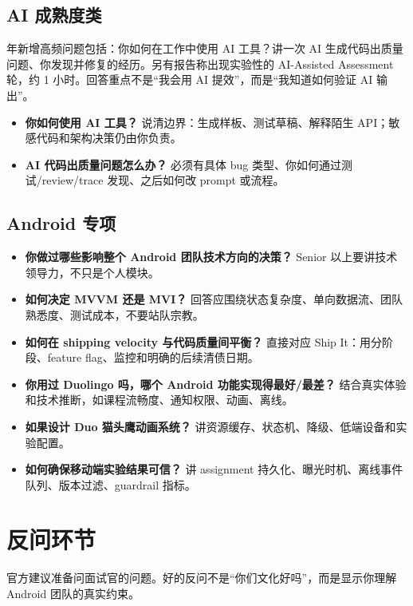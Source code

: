 \subsection{AI 成熟度类}

 年新增高频问题包括：你如何在工作中使用 AI 工具？讲一次 AI 生成代码出质量问题、你发现并修复的经历。另有报告称出现实验性的 AI-Assisted Assessment 轮，约 1 小时。回答重点不是“我会用 AI 提效”，而是“我知道如何验证 AI 输出”。

\begin{itemize}
  \item \textbf{你如何使用 AI 工具？} 说清边界：生成样板、测试草稿、解释陌生 API；敏感代码和架构决策仍由你负责。
  \item \textbf{AI 代码出质量问题怎么办？} 必须有具体 bug 类型、你如何通过测试/review/trace 发现、之后如何改 prompt 或流程。
\end{itemize}

\subsection{Android 专项}

\begin{itemize}
  \item \textbf{你做过哪些影响整个 Android 团队技术方向的决策？} Senior 以上要讲技术领导力，不只是个人模块。
  \item \textbf{如何决定 MVVM 还是 MVI？} 回答应围绕状态复杂度、单向数据流、团队熟悉度、测试成本，不要站队宗教。
  \item \textbf{如何在 shipping velocity 与代码质量间平衡？} 直接对应 Ship It：用分阶段、feature flag、监控和明确的后续清债日期。
  \item \textbf{你用过 Duolingo 吗，哪个 Android 功能实现得最好/最差？} 结合真实体验和技术推断，如课程流畅度、通知权限、动画、离线。
  \item \textbf{如果设计 Duo 猫头鹰动画系统？} 讲资源缓存、状态机、降级、低端设备和实验配置。
  \item \textbf{如何确保移动端实验结果可信？} 讲 assignment 持久化、曝光时机、离线事件队列、版本过滤、guardrail 指标。
\end{itemize}

\section{反问环节}

\srcofficial 官方建议准备问面试官的问题。好的反问不是“你们文化好吗”，而是显示你理解 Android 团队的真实约束。

